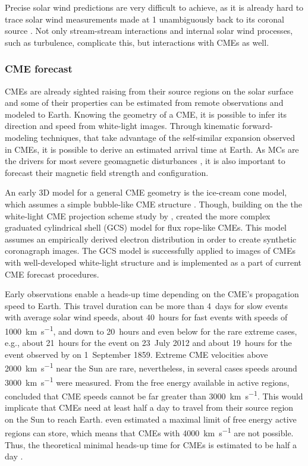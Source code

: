 Precise solar wind predictions are very difficult to achieve, as it is already hard to trace solar wind measurements made at \SI{1}{\au} unambiguously back to its coronal source \citep{Cranmer2017}. Not only stream-stream interactions and internal solar wind processes, such as turbulence, complicate this, but interactions with CMEs as well.


\subsubsection*{CME forecast}
CMEs are already sighted raising from their source regions on the solar surface and some of their properties can be estimated from remote observations and modeled to Earth.
Knowing the geometry of a CME, it is possible to infer its direction and speed from white-light images. Through kinematic forward-modeling techniques, that take advantage of the self-similar expansion observed in CMEs, it is possible to derive an estimated arrival time at Earth. As MCs are the drivers for most severe geomagnetic disturbances \citep{Bothmer1995,Cane2003}, it is also important to forecast their magnetic field strength and configuration.

An early 3D model for a general CME geometry is the ice-cream cone model, which assumes a simple bubble-like CME structure \citep{Fisher1984}. Though, building on the the white-light CME projection scheme study by \citet{Cremades2004}, \citet{Thernisien2006} created the more complex graduated cylindrical shell (GCS) model for flux rope-like CMEs. This model assumes an empirically derived electron distribution in order to create synthetic coronagraph images. The GCS model is successfully applied to images of CMEs with well-developed white-light structure \citep{Bosman2012} and is implemented as a part of current CME forecast procedures.

Early observations enable a heads-up time depending on the CME's propagation speed to Earth. This travel duration can be more than 4~days for slow events with average solar wind speeds, about 40~hours for fast events with speeds of \SI{1000}{\km\per\s}, and down to 20~hours and even below for the rare extreme cases, e.g., about 21~hours for the event on 23~July 2012 \citep{Russell2013,Temmer2015} and about 19~hours for the event observed by \citet{Carrington1859} on 1~September 1859.
Extreme CME velocities above \SI{2000}{\km\per\s} near the Sun are rare, nevertheless, in several cases speeds around \SI{3000}{\km\per\s} were measured. From the free energy available in active regions, \citet{Gopalswamy2005} concluded that CME speeds cannot be far greater than \SI{3000}{\km\per\s}. This would implicate that CMEs need at least half a day to travel from their source region on the Sun to reach Earth. \citet{Gopalswamy2010} even estimated a maximal limit of free energy active regions can store, which means that CMEs with \SI{4000}{\km\per\s} are not possible. Thus, the theoretical minimal heads-up time for CMEs is estimated to be half a day \citep{Gopalswamy2005}.

